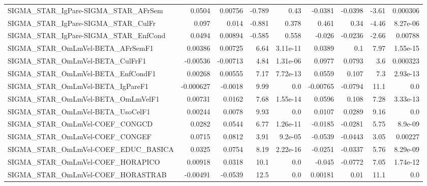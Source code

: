 \begin{tabular}{lrrrrrrrr}
SIGMA\_STAR\_IgPare-SIGMA\_STAR\_AFrSem   &      0.0504 &      0.00756 &   -0.789 &     0.43 &    -0.0381 &     -0.0398 &        -3.61 &      0.000306 \\
SIGMA\_STAR\_IgPare-SIGMA\_STAR\_CulFr    &       0.097 &        0.014 &   -0.881 &    0.378 &      0.461 &        0.34 &        -4.46 &      8.27e-06 \\
SIGMA\_STAR\_IgPare-SIGMA\_STAR\_EnfCond  &      0.0494 &      0.00894 &   -0.585 &    0.558 &     -0.026 &     -0.0236 &        -2.66 &       0.00788 \\
SIGMA\_STAR\_OmLmVel-BETA\_AFrSemF1      &     0.00386 &      0.00725 &     6.64 & 3.11e-11 &     0.0389 &         0.1 &         7.97 &      1.55e-15 \\
SIGMA\_STAR\_OmLmVel-BETA\_CulFrF1       &    -0.00536 &     -0.00713 &     4.84 & 1.31e-06 &     0.0977 &      0.0793 &          3.6 &      0.000323 \\
SIGMA\_STAR\_OmLmVel-BETA\_EnfCondF1     &     0.00268 &      0.00555 &     7.17 & 7.72e-13 &     0.0559 &       0.107 &          7.3 &      2.93e-13 \\
SIGMA\_STAR\_OmLmVel-BETA\_IgPareF1      &   -0.000627 &      -0.0018 &     9.99 &      0.0 &   -0.00765 &     -0.0794 &         11.1 &           0.0 \\
SIGMA\_STAR\_OmLmVel-BETA\_OmLmVelF1     &     0.00731 &       0.0162 &     7.68 & 1.55e-14 &     0.0596 &       0.108 &         7.28 &      3.33e-13 \\
SIGMA\_STAR\_OmLmVel-BETA\_UsoCelF1      &     0.00244 &       0.0078 &     9.93 &      0.0 &     0.0107 &      0.0289 &         9.16 &           0.0 \\
SIGMA\_STAR\_OmLmVel-COEF\_CONGCD        &      0.0282 &       0.0544 &     6.77 & 1.26e-11 &    -0.0185 &     -0.0281 &         5.75 &       8.9e-09 \\
SIGMA\_STAR\_OmLmVel-COEF\_CONGEF        &      0.0715 &       0.0812 &     3.91 &  9.2e-05 &    -0.0539 &     -0.0443 &         3.05 &       0.00227 \\
SIGMA\_STAR\_OmLmVel-COEF\_EDUC\_BASICA   &      0.0325 &       0.0754 &     8.19 & 2.22e-16 &    -0.0251 &     -0.0337 &         5.76 &      8.29e-09 \\
SIGMA\_STAR\_OmLmVel-COEF\_HORAPICO      &     0.00918 &       0.0318 &     10.1 &      0.0 &     -0.045 &     -0.0772 &         7.05 &      1.74e-12 \\
SIGMA\_STAR\_OmLmVel-COEF\_HORASTRAB     &    -0.00491 &      -0.0539 &     12.5 &      0.0 &    0.00181 &        0.01 &         11.1 &           0.0 \\

\end{tabular}

